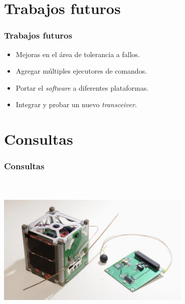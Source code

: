 \documentclass[xcolor=dvipsnames]{beamer}
\begin{document}
    \section{Trabajos futuros}
    \begin{frame}
        \frametitle{Trabajos futuros}
        \begin{itemize}
            \item Mejoras en el área de tolerancia a fallos.
            \item Agregar múltiples ejecutores de comandos.
            \item Portar el \textit{software} a diferentes plataformas.
            \item Integrar y probar un nuevo \textit{transceiver}.
        \end{itemize}

    \end{frame}
    
    \section{Consultas}
    \begin{frame}
        \frametitle{Consultas}
        \centering
        \Large {}\\
        
        \normalsize {}\\
        
        \vspace{1cm}
        \includegraphics[width=0.7\textwidth]{img/suchai_satellite.jpg}
    \end{frame}
    
\end{document}
